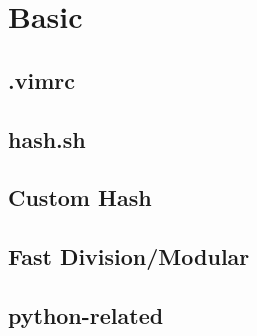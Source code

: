\documentclass[a4paper,10pt,twocolumn,oneside]{article}
\begin{document}
\pagestyle{fancy}
\fancyfoot{}
\fancyhead[R]{\thepage}
\renewcommand{\headrulewidth}{0.4pt}
\renewcommand{\contentsname}{Contents} 

\scriptsize
\tableofcontents


\section{Basic}
\subsection{.vimrc}


\subsection{hash.sh}


%

%

%

\subsection{Custom Hash}


\subsection{Fast Division/Modular}


\subsection{python-related}

\end{document}
